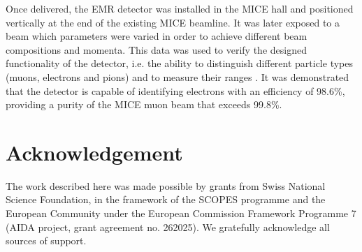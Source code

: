 \documentclass[a4paper,11pt]{article}
\begin{document}
Once delivered, the EMR detector was installed in the MICE hall and positioned vertically at the end of the existing MICE beamline. It was later exposed
to a beam which parameters were varied in order to achieve different beam compositions and momenta. This data was used to verify the designed 
functionality of the detector, i.e. the ability to distinguish different particle types (muons, electrons and pions) and to measure their ranges
\cite{performance}. It was demonstrated that the detector is capable of identifying electrons with an efficiency of 98.6\%, providing a purity of the
MICE muon beam that exceeds 99.8\%.

\section*{Acknowledgement}
The work described here was made possible by grants from Swiss National Science Foundation, in the framework of the SCOPES programme and the European
Community under the European Commission Framework Programme 7 (AIDA project, grant agreement no. 262025). We gratefully acknowledge all sources of support.




\end{document}
